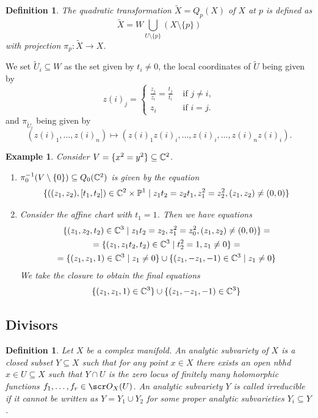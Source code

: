 \documentclass[A4paper, british, reqno]{amsart}
\theoremstyle{darkgreentheorem}
\theoremstyle{darkbluedefinition}
\newtheorem{defn}[thm]{Definition}
\theoremstyle{darkredexample}
\newtheorem{exa}[thm]{Example}
\theoremstyle{remark}
\newcommand{\1}{\mathbbm{1}}
\newcommand{\tms}{\times}
\newcommand{\sub}{\subseteq}
\begin{document}
\begin{defn}
    The \textit{quadratic transformation} $\tilde{X}=Q_{p}(X)$ of $X$ at $p$ is defined as
    \[ \tilde{X}=W\bigcup_{U\setminus \{p\}}(X\setminus \{p\}) \]
    with projection $\pi_{p}\colon \tilde{X}\to X$.
\end{defn}

We set $\tilde{U}_{i}\sub W$ as the set given by $t_{i}\neq 0$, the local coordinates of $\tilde{U}$ being given by
\[ z(i)_{j}=\begin{cases} \frac{z_{j}}{z_{i}}=\frac{t_{j}}{t_{i}} & \text{ if } j\neq i, \\ z_{i} &\text{ if } i=j.\end{cases} \]
and $\pi_{\tilde{U}_{i}}$ being given by
\[(z(i)_{1},\ldots,z(i)_{n})\mapsto (z(i)_{1}z(i)_{i},\ldots,z(i)_{i},\ldots,z(i)_{n}z(i)_{i}).\]

\begin{exa}
    Consider $V=\{ x^{2}=y^{2}\}\sub \C^{2}$.
    \begin{enumerate}
	\item $\pi_{0}^{-1}(V\setminus \{0\})\sub Q_{0}(\C^{2})$ is given by the equation
	    \[ \{ ((z_{1},z_{2}),[t_{1},t_{2}])\in \C^{2}\tms \P^{1}\mid z_{1}t_{2}=z_{2}t_{1},z_{1}^{2}=z_{2}^{2},(z_{1},z_{2})\neq (0,0)\} \]
	\item Consider the affine chart with $t_{1}=1$.
	    Then we have equations
	    \begin{multline*}
		\{(z_{1},z_{2},t_{2})\in \mathbb{C}^{3}\mid z_{1}t_{2}=z_{2},z_{1}^{2}=z_{0}^{2},(z_{1},z_{2})\neq (0,0) \} =\\  =\{ (z_{1},z_{1}t_{2},t_{2})\in \mathbb{C}^{3}\mid t_{2}^{2}=1,z_{1}\neq 0\} =\\
		=\{ (z_{1},z_{1},1)\in \mathbb{C}^{3}\mid z_{1}\neq 0 \} \cup \{(z_{1},-z_{1},-1)\in \mathbb{C}^{3}\mid z_{1}\neq 0\}
	    \end{multline*}
	    We take the closure to obtain the final equations
	    \[ \{(z_{1},z_{1},1)\in \mathbb{C}^{3}\}\cup \{(z_{1},-z_{1},-1)\in \mathbb{C}^{3}\} \]
    \end{enumerate}
\end{exa}

\subsection{Divisors}

\begin{defn}
    Let $X$ be a complex manifold.
    An \textit{analytic subvariety} of $X$ is a closed subset $Y\sub X$ such that for any point $x\in X$ there exists an open nbhd $x\in U\sub X$ such that $Y\cap U$ is the zero locus of finitely many holomorphic functions $f_{1},\ldots,f_{r}\in \O_{X}(U)$.
    An analytic subvariety $Y$ is called \textit{irreducible} if it cannot be written as $Y=Y_{1}\cup Y_{2}$ for some proper analytic subvarieties $Y_{i}\sub Y$.
\end{defn}
\end{document}

